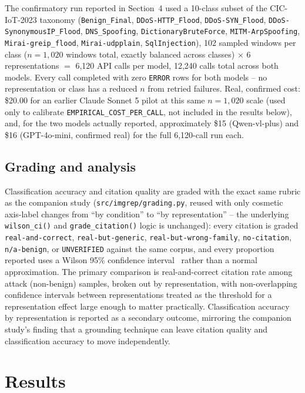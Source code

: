 \documentclass[twocolumn]{svjour3}
\begin{document}
The confirmatory run reported in Section~4 used a 10-class subset of the CIC-IoT-2023
taxonomy (\texttt{Benign\_Final}, \texttt{DDoS-HTTP\_Flood}, \texttt{DDoS-SYN\_Flood},
\texttt{DDoS-SynonymousIP\_Flood}, \texttt{DNS\_Spoofing}, \texttt{DictionaryBruteForce},
\texttt{MITM-ArpSpoofing}, \texttt{Mirai-greip\_flood}, \texttt{Mirai-udpplain},
\texttt{SqlInjection}), 102 sampled windows per class ($n=1{,}020$ windows total, exactly balanced
across classes) $\times$ 6 representations $=$ 6,120 API calls per model, 12,240 calls total across
both models. Every call completed with zero \texttt{ERROR} rows for both models -- no representation
or class has a reduced $n$ from retried failures. Real, confirmed cost: \$20.00 for an earlier
Claude Sonnet 5 pilot at this same $n=1{,}020$ scale (used only to calibrate
\texttt{EMPIRICAL\_COST\_PER\_CALL}, not included in the results below), and, for the two models
actually reported, approximately \$15 (Qwen-vl-plus) and \$16 (GPT-4o-mini, confirmed real) for the
full 6,120-call run each.

\subsection{Grading and analysis}

Classification accuracy and citation quality are graded with the exact same rubric as the companion
study (\texttt{src/imgrep/grading.py}, reused with only cosmetic axis-label changes from
``by condition'' to ``by representation'' -- the underlying \texttt{wilson\_ci()} and
\texttt{grade\_citation()} logic is unchanged): every citation is graded
\texttt{real-and-correct}, \texttt{real-but-generic}, \texttt{real-but-wrong-family},
\texttt{no-citation}, \texttt{n/a-benign}, or \texttt{UNVERIFIED} against the same corpus, and every
proportion reported uses a Wilson 95\% confidence interval~\cite{wilson1927} rather than a normal
approximation. The primary comparison is real-and-correct citation rate among attack (non-benign)
samples, broken out by representation, with non-overlapping confidence intervals between
representations treated as the threshold for a representation effect large enough to matter
practically. Classification accuracy by representation is reported as a secondary outcome, mirroring
the companion study's finding that a grounding technique can leave citation quality and
classification accuracy to move independently.

\section{Results}
\label{sec:results}
\end{document}
